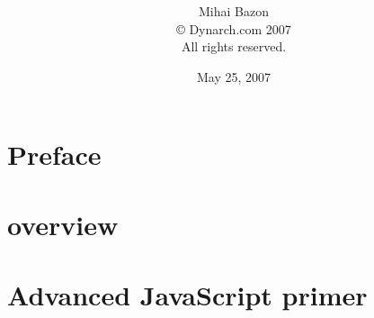 \documentclass[a4paper,twoside,11pt,openany]{book}
\title{\textbf{\TheLibLongName}\\\normalsize\TheLibURL}
\author{Mihai Bazon\\© Dynarch.com 2007\\All rights reserved.}
\date{May 25, 2007}
\begin{document}
\frontmatter
\maketitle
\chapter{Preface}
\tableofcontents
\mainmatter
\chapter{\TheLibName{} overview}
\appendix
\chapter{Advanced JavaScript primer}

\end{document}
